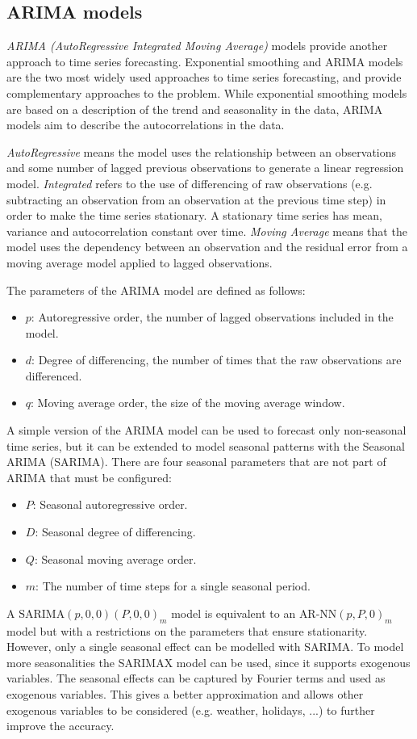 \subsection{ARIMA models}
\label{subsec:arima_models}
\emph{ARIMA (AutoRegressive Integrated Moving Average)} models provide another approach to time series forecasting. Exponential smoothing and ARIMA models are the two most widely used approaches to time series forecasting, and provide complementary approaches to the problem. While exponential smoothing models are based on a description of the trend and seasonality in the data, ARIMA models aim to describe the autocorrelations in the data.\cite{hyndman}

\emph{AutoRegressive} means the model uses the relationship between an observations and some number of lagged previous observations to generate a linear regression model. \emph{Integrated} refers to the use of differencing of raw observations (e.g. subtracting an observation from an observation at the previous time step) in order to make the time series stationary. A stationary time series has mean, variance and autocorrelation constant over time. \emph{Moving Average} means that the model uses the dependency between an observation and the residual error from a moving average model applied to lagged observations.

The parameters of the ARIMA model are defined as follows:
\begin{itemize}
  \item \( p \): Autoregressive order, the number of lagged observations included in the model.
  \item \( d \): Degree of differencing, the number of times that the raw observations are differenced.
  \item \( q \): Moving average order, the size of the moving average window.
\end{itemize}

A simple version of the ARIMA model can be used to forecast only non-seasonal time series, but it can be extended to model seasonal patterns with the Seasonal ARIMA (SARIMA). There are four seasonal parameters that are not part of ARIMA that must be configured:
\begin{itemize}
  \item \( P \): Seasonal autoregressive order.
  \item \( D \): Seasonal degree of differencing.
  \item \( Q \): Seasonal moving average order.
  \item \( m \): The number of time steps for a single seasonal period.
\end{itemize}
A \( \text{SARIMA}(p,0,0)(P,0,0)_m \) model is equivalent to an \( \text{AR-NN}(p,P,0)_m \) model but with a restrictions on the parameters that ensure stationarity.
However, only a single seasonal effect can be modelled with SARIMA. To model more seasonalities the SARIMAX model can be used, since it supports exogenous variables. The seasonal effects can be captured by Fourier terms and used as exogenous variables. This gives a better approximation and allows other exogenous variables to be considered (e.g. weather, holidays, ...) to further improve the accuracy.

